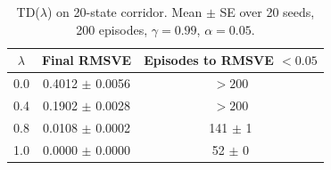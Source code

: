\begin{table}[h]
\centering
\caption{TD($\lambda$) on 20-state corridor. Mean $\pm$ SE over 20 seeds, 200 episodes, $\gamma = 0.99$, $\alpha = 0.05$.}
\label{tab:td_lambda_corridor}
\begin{tabular}{ccc}
\hline
$\lambda$ & Final RMSVE & Episodes to RMSVE $< 0.05$ \\
\hline
0.0 & 0.4012 $\pm$ 0.0056 & $> 200$ \\
0.4 & 0.1902 $\pm$ 0.0028 & $> 200$ \\
0.8 & 0.0108 $\pm$ 0.0002 & 141 $\pm$ 1 \\
1.0 & 0.0000 $\pm$ 0.0000 & 52 $\pm$ 0 \\
\hline
\end{tabular}
\end{table}
